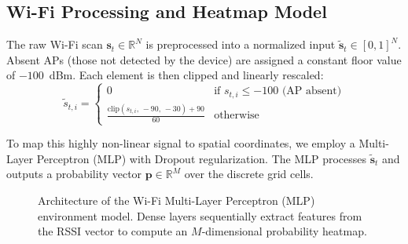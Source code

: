 \documentclass[conference]{IEEEtran}
\begin{document}
\subsection{Wi-Fi Processing and Heatmap Model}

The raw Wi-Fi scan $\mathbf{s}_t \in \mathbb{R}^N$ is preprocessed into a normalized input $\tilde{\mathbf{s}}_t \in [0,1]^N$. Absent APs (those not detected by the device) are assigned a constant floor value of $-100$~dBm. Each element is then clipped and linearly rescaled:
\begin{equation}
\tilde{s}_{t,i} = \begin{cases} 0 & \text{if } s_{t,i} \leq -100 \text{ (AP absent)} \\ \frac{\text{clip}(s_{t,i},\, -90,\, -30) + 90}{60} & \text{otherwise} \end{cases} \label{eq:wifi_norm}
\end{equation}

To map this highly non-linear signal to spatial coordinates, we employ a Multi-Layer Perceptron (MLP) with Dropout regularization. The MLP processes $\tilde{\mathbf{s}}_t$ and outputs a probability vector $\mathbf{p} \in \mathbb{R}^M$ over the discrete grid cells. 
\begin{figure}[htbp]
\centering
{}
\caption{Architecture of the Wi-Fi Multi-Layer Perceptron (MLP) environment model. Dense layers sequentially extract features from the RSSI vector to compute an $M$-dimensional probability heatmap.}
\label{fig:mlp_arch}
\end{figure}
\end{document}
